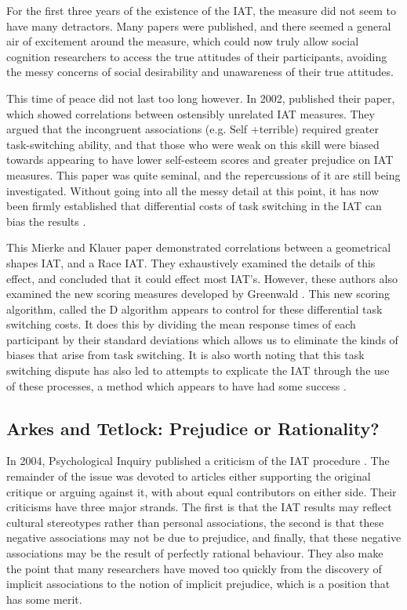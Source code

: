 For the first three years of the existence of the IAT, the measure did not seem to have many detractors. Many papers were published, and there seemed a general air of excitement around the measure, which could now truly allow social cognition researchers to access the true attitudes of their participants, avoiding the messy concerns of social desirability and unawareness of their true attitudes. 

This time of peace did not last too long however. In 2002, \cite{McFarland2002} published their paper, which showed correlations between ostensibly unrelated IAT measures. They argued that the incongruent associations (e.g. Self +terrible) required greater task-switching ability, and that those who were weak on this skill were biased towards appearing to have lower self-esteem scores and greater prejudice on IAT measures. This paper was quite seminal, and the repercussions of it are still being investigated. Without going into all the messy detail at this point, it has now been firmly established that differential costs of task switching in the IAT can bias the results \cite{Mierke2001,Mierke2003}. 

This Mierke and Klauer paper demonstrated correlations between a geometrical shapes IAT, and a Race IAT. They exhaustively examined the details of this effect, and concluded that it could effect most IAT's. However, these authors also examined the new scoring measures developed by Greenwald \cite{Greenwald2003a}. This new scoring algorithm, called the D algorithm appears to control for these differential task switching costs. It does this by dividing the mean response times of each participant by their standard deviations which allows us to eliminate the kinds of biases that arise from task switching. It is also worth noting that this task switching dispute has also led to attempts to explicate the IAT through the use of these processes, a method which appears to have had some success \cite{Klauer2005}. 

\subsection{Arkes and Tetlock: Prejudice or Rationality?}

In 2004, Psychological Inquiry published a criticism of the IAT procedure \cite{Arkes2004}. The remainder of the issue was devoted to articles either supporting the original critique or arguing against it, with about equal contributors on either side. Their criticisms have three major strands. The first is that the IAT results may reflect cultural stereotypes rather than personal associations, the second is that these negative associations may not be due to prejudice, and finally, that these negative associations may be the result of perfectly rational behaviour. They also make the point that many researchers have moved too quickly from the discovery of implicit associations to the notion of implicit prejudice, which is a position that has some merit. 

